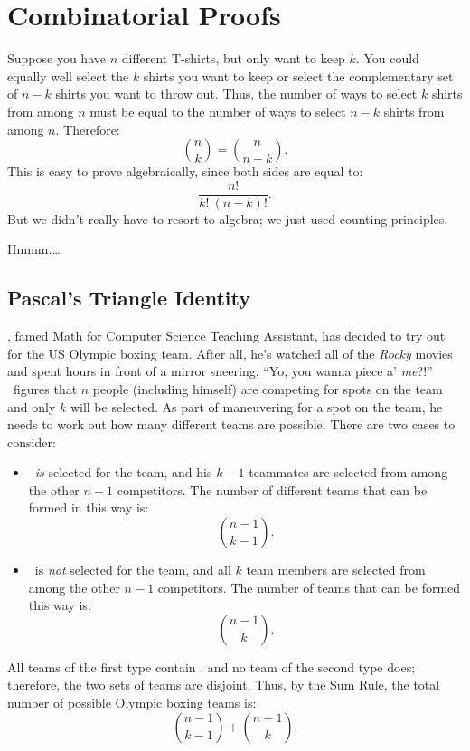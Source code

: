 \section{Combinatorial Proofs}\label{combinatorial_proof_sec}

Suppose you have $n$ different T-shirts, but only want to keep $k$.
You could equally well select the $k$ shirts you want to keep or
select the complementary set of $n - k$ shirts you want to throw out.
Thus, the number of ways to select $k$ shirts from among $n$ must be
equal to the number of ways to select $n - k$ shirts from among $n$.
Therefore:
%
\[
    \binom{n}{k} = \binom{n}{n-k}.
\]
%
This is easy to prove algebraically, since both sides are equal to:
%
\[
    \frac{n!}{k!\ (n-k)!}.
\]
%
But we didn't really have to resort to algebra; we just used counting
principles.

Hmmm.\dots

\subsection{Pascal's Triangle Identity}\label{subsec:pascal}

\Jay, famed Math for Computer Science Teaching Assistant, has decided
to try out for the US Olympic boxing team.  After all, he's watched
all of the \emph{Rocky} movies and spent hours in front of a mirror
sneering, ``Yo, you wanna piece a' \emph{me}?!''  \Jay\ figures that $n$
people (including himself) are competing for spots on the team and
only $k$ will be selected.  As part of maneuvering for a spot on the
team, he needs to work out how many different teams are possible.
There are two cases to consider:

\begin{itemize}

\item \Jay\ \emph{is} selected for the team, and his $k - 1$
  teammates are selected from among the other $n - 1$ competitors.
  The number of different teams that can be formed in this way is:
%
\[
\binom{n-1}{k-1}.
\]

\item \Jay\ is \emph{not} selected for the team, and all $k$ team
members are selected from among the other $n - 1$ competitors.  The
number of teams that can be formed this way is:
%
\[
\binom{n - 1}{k}.
\]

\end{itemize}

All teams of the first type contain \Jay, and no team of the second
type does; therefore, the two sets of teams are disjoint.  Thus, by
the Sum Rule, the total number of possible Olympic boxing teams is:
%
\[
\binom{n-1}{k-1} + \binom{n - 1}{k}.
\]

